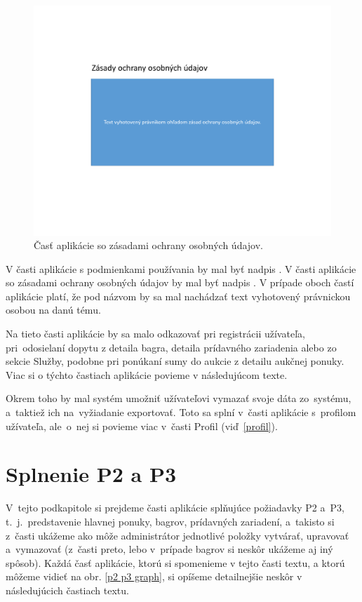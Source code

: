 \begin{figure}[H]\centering
\includegraphics[width=140mm]{../img/UI concept/gdpr2}
\caption{Časť aplikácie so zásadami ochrany osobných údajov.}
\label{gdpr2}
\end{figure}

V časti aplikácie s podmienkami používania by mal byť nadpis . V časti aplikácie so zásadami ochrany osobných údajov by mal byť nadpis . V prípade oboch častí aplikácie platí, že pod názvom by sa mal nachádzať text vyhotovený právnickou osobou na danú tému.

Na tieto časti aplikácie by sa malo odkazovať pri registrácii užívateľa, pri~odosielaní dopytu z detaila bagra, detaila prídavného zariadenia alebo zo sekcie Služby, podobne pri ponúkaní sumy do aukcie z detailu aukčnej ponuky. Viac si o týchto častiach aplikácie povieme v následujúcom texte.

Okrem toho by mal systém umožniť užívateľovi vymazať svoje dáta zo~systému, a~taktiež ich na~vyžiadanie exportovať. Toto sa splní v~časti aplikácie s~profilom užívateľa, ale~o~nej si povieme viac v~časti Profil (viď~\ref{profil}).

\section{Splnenie P2 a P3}

V~tejto podkapitole si prejdeme časti aplikácie splňujúce požiadavky P2 a~P3, t.~j.~predstavenie hlavnej ponuky, bagrov, prídavných zariadení, a~takisto si z~časti ukážeme ako môže administrátor jednotlivé položky vytvárať, upravovať a~vymazovať (z~časti preto, lebo v~prípade bagrov si neskôr ukážeme aj iný spôsob). Každá časť aplikácie, ktorú si spomenieme v tejto časti textu, a ktorú môžeme vidieť na obr. \ref{p2 p3 graph}, si opíšeme detailnejšie neskôr v následujúcich častiach textu.

